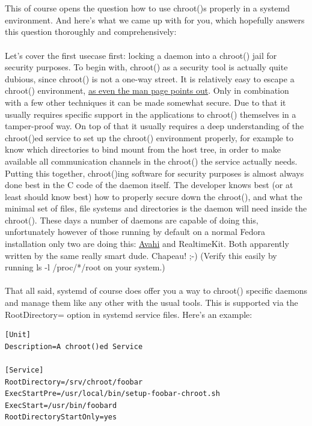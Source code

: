 \documentclass[titlepage]{article}
\begin{document}
\\
\\
This of course opens the question how to use chroot()s properly in a systemd environment. And here's what we came up with for you, which hopefully answers this question thoroughly and comprehensively:
\\
\\
Let's cover the first usecase first: locking a daemon into a chroot() jail for security purposes. To begin with, chroot() as a security tool is actually quite dubious, since chroot() is not a one-way street. It is relatively easy to escape a chroot() environment, \href{http://linux.die.net/man/2/chroot}{as even the man page points out}. Only in combination with a few other techniques it can be made somewhat secure. Due to that it usually requires specific support in the applications to chroot() themselves in a tamper-proof way. On top of that it usually requires a deep understanding of the chroot()ed service to set up the chroot() environment properly, for example to know which directories to bind mount from the host tree, in order to make available all communication channels in the chroot() the service actually needs. Putting this together, chroot()ing software for security purposes is almost always done best in the C code of the daemon itself. The developer knows best (or at least should know best) how to properly secure down the chroot(), and what the minimal set of files, file systems and directories is the daemon will need inside the chroot(). These days a number of daemons are capable of doing this, unfortunately however of those running by default on a normal Fedora installation only two are doing this: \href{https://avahi.org/}{Avahi} and RealtimeKit. Both apparently written by the same really smart dude. Chapeau! ;-) (Verify this easily by running ls -l /proc/*/root on your system.)
\\
\\
That all said, systemd of course does offer you a way to chroot() specific daemons and manage them like any other with the usual tools. This is supported via the RootDirectory= option in systemd service files. Here's an example:
\begin{lstlisting}
[Unit]
Description=A chroot()ed Service

[Service]
RootDirectory=/srv/chroot/foobar
ExecStartPre=/usr/local/bin/setup-foobar-chroot.sh
ExecStart=/usr/bin/foobard
RootDirectoryStartOnly=yes
\end{lstlisting}
\end{document}
